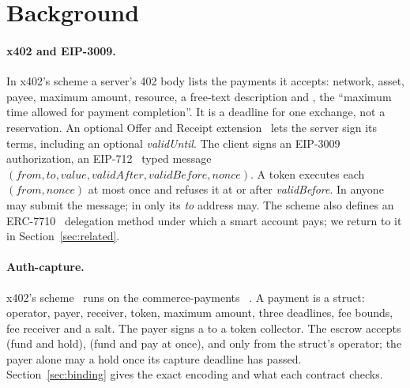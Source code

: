 \section{Background}
\label{sec:background}

\paragraph{x402 and EIP-3009.} In x402's  scheme a server's 402 body lists the payments it
accepts: network, asset, payee, maximum amount, resource, a free-text description and
, the ``maximum time allowed for payment completion''. It is a deadline for one
exchange, not a reservation. An optional Offer and Receipt extension~\cite{x402offer} lets the server sign
its terms, including an optional \textit{validUntil}. The client signs an EIP-3009~\cite{eip3009}
authorization, an EIP-712~\cite{eip712} typed message $(\mathit{from}, \mathit{to}, \mathit{value},
\mathit{validAfter}, \mathit{validBefore}, \mathit{nonce})$. A token executes each $(\mathit{from},
\mathit{nonce})$ at most once and refuses it at or after \textit{validBefore}. In
 anyone may submit the message; in  only its
\textit{to} address may. The  scheme also defines an ERC-7710~\cite{erc7710} delegation method
under which a smart account pays; we return to it in Section~\ref{sec:related}.

\paragraph{Auth-capture.} x402's  scheme~\cite{x402authcapture} runs on the
commerce-payments ~\cite{commercepayments}. A payment is a 
struct: operator, payer, receiver, token, maximum amount, three deadlines, fee bounds, fee receiver and a
salt. The payer signs a  to a token collector. The escrow accepts
 (fund and hold),  (fund and pay at once),  and  only
from the struct's operator; the payer alone may  a hold once its capture deadline has passed.
Section~\ref{sec:binding} gives the exact encoding and what each contract checks.

